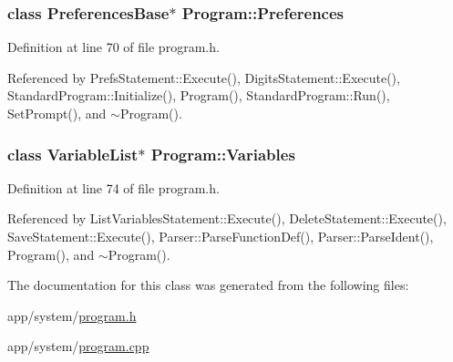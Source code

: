 \subsubsection[{\texorpdfstring{Preferences}{Preferences}}]{\setlength{\rightskip}{0pt plus 5cm}class {\bf Preferences\+Base}$\ast$ Program\+::\+Preferences}\hypertarget{classProgram_ad6baa89972cb4938db341c77c1510793}{}\label{classProgram_ad6baa89972cb4938db341c77c1510793}


Definition at line 70 of file program.\+h.



Referenced by Prefs\+Statement\+::\+Execute(), Digits\+Statement\+::\+Execute(), Standard\+Program\+::\+Initialize(), Program(), Standard\+Program\+::\+Run(), Set\+Prompt(), and $\sim$\+Program().

\subsubsection[{\texorpdfstring{Variables}{Variables}}]{\setlength{\rightskip}{0pt plus 5cm}class {\bf Variable\+List}$\ast$ Program\+::\+Variables}\hypertarget{classProgram_a1d4f53befb0270e64c91c24d14061188}{}\label{classProgram_a1d4f53befb0270e64c91c24d14061188}


Definition at line 74 of file program.\+h.



Referenced by List\+Variables\+Statement\+::\+Execute(), Delete\+Statement\+::\+Execute(), Save\+Statement\+::\+Execute(), Parser\+::\+Parse\+Function\+Def(), Parser\+::\+Parse\+Ident(), Program(), and $\sim$\+Program().



The documentation for this class was generated from the following files\+:\begin{DoxyCompactItemize}
\item 
app/system/\hyperlink{program_8h}{program.\+h}\item 
app/system/\hyperlink{program_8cpp}{program.\+cpp}\end{DoxyCompactItemize}
